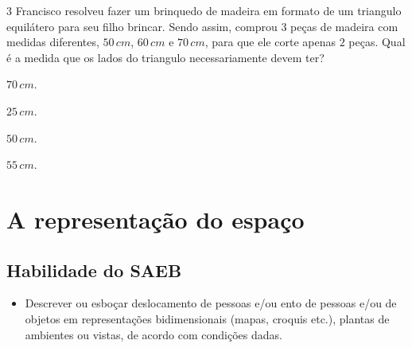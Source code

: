 {{{{\num{3}  Francisco resolveu fazer um brinquedo de madeira em formato de um
triangulo equilátero para seu filho brincar. Sendo assim, comprou $3$ peças
de madeira com medidas diferentes, $50\,cm$, $60\,cm$ e $70\,cm$, para que ele
corte apenas $2$ peças. Qual é a medida que os lados do triangulo
necessariamente devem ter?

\begin{escolha}
\item $70\,cm$.
\item $25\,cm$.
\item $50\,cm$.
\item $55\,cm$.
\end{escolha}



\chapter{A representação do espaço}

\section*{Habilidade do SAEB} 
\begin{itemize}
\item Descrever ou esboçar deslocamento de pessoas e/ou
ento de pessoas e/ou de objetos em representações bidimensionais (mapas, croquis etc.),
plantas de ambientes ou vistas, de acordo com condições dadas.
\end{itemize}

}}}}
